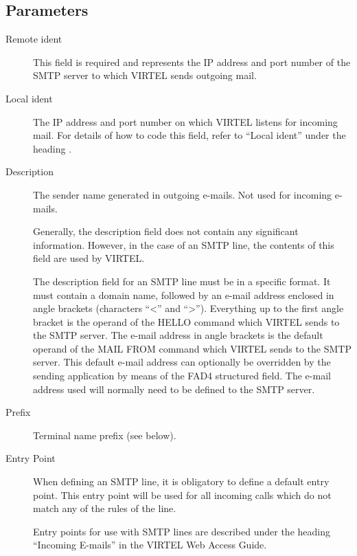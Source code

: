 \documentclass[letterpaper,10pt,english]{sphinxmanual}
\begin{document}
\subsection{Parameters}
\label{\detokenize{connectivity_guide:index-18}}\label{\detokenize{connectivity_guide:id3}}\begin{description}
\item[{Remote ident}] \leavevmode
This field is required and represents the IP address and port number of the SMTP server to which VIRTEL sends outgoing mail.

\item[{Local ident}] \leavevmode
The IP address and port number on which VIRTEL listens for incoming mail. For details of how to code this field, refer to “Local ident” under the heading {\hyperref[\detokenize{connectivity_guide:bookmark13}]{}}.

\item[{Description}] \leavevmode
The sender name generated in outgoing e-mails. Not used for incoming e-mails.

Generally, the description field does not contain any significant information. However, in the case of an SMTP line, the contents of this field are used by VIRTEL.

The description field for an SMTP line must be in a specific format. It must contain a domain name, followed by an e-mail address enclosed in angle brackets (characters “\textless{}” and “\textgreater{}”). Everything up to the first angle bracket is the operand of the HELLO command which VIRTEL sends to the SMTP server. The e-mail address in angle brackets is the default operand of the MAIL FROM command which VIRTEL sends to the SMTP server. This default e-mail address can optionally be overridden by the sending application by means of the
FAD4 structured field. The e-mail address used will normally need to be defined to the SMTP server.

\item[{Prefix}] \leavevmode
Terminal name prefix (see below).

\item[{Entry Point}] \leavevmode
When defining an SMTP line, it is obligatory to define a default entry point. This entry point will be used for all incoming calls which do not match any of the rules of the line.

Entry points for use with SMTP lines are described under the heading “Incoming E-mails” in the VIRTEL Web Access Guide.


\end{description}
\end{document}
